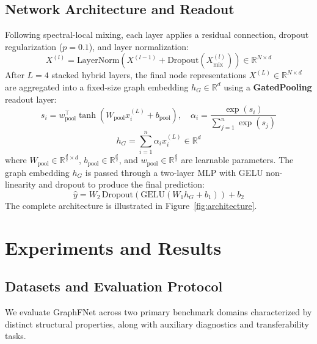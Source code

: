 \documentclass[10pt]{article}
\begin{document}
\subsection{Network Architecture and Readout}
Following spectral-local mixing, each layer applies a residual connection, dropout regularization ($p=0.1$), and layer normalization:
\begin{equation}
X^{(l)} = \text{LayerNorm}\left( X^{(l-1)} + \text{Dropout}\left( X^{(l)}_{\text{mix}} \right) \right) \in \mathbb{R}^{N \times d}
\end{equation}
After $L=4$ stacked hybrid layers, the final node representations $X^{(L)} \in \mathbb{R}^{N \times d}$ are aggregated into a fixed-size graph embedding $h_G \in \mathbb{R}^d$ using a \textbf{GatedPooling} readout layer:
\begin{equation}
\label{eq:gated_pool}
s_i = w_{\text{pool}}^\top \tanh\left( W_{\text{pool}} x_i^{(L)} + b_{\text{pool}} \right), \quad \alpha_i = \frac{\exp(s_i)}{\sum_{j=1}^n \exp(s_j)}
\end{equation}
\begin{equation}
h_G = \sum_{i=1}^n \alpha_i x_i^{(L)} \in \mathbb{R}^d
\end{equation}
where $W_{\text{pool}} \in \mathbb{R}^{\frac{d}{2} \times d}$, $b_{\text{pool}} \in \mathbb{R}^{\frac{d}{2}}$, and $w_{\text{pool}} \in \mathbb{R}^{\frac{d}{2}}$ are learnable parameters. The graph embedding $h_G$ is passed through a two-layer MLP with GELU non-linearity and dropout to produce the final prediction:
\begin{equation}
\hat{y} = W_2 \, \text{Dropout}\left( \text{GELU}\left( W_1 h_G + b_1 \right) \right) + b_2
\end{equation}
The complete architecture is illustrated in Figure~\ref{fig:architecture}.

\section{Experiments and Results}
\label{sec:results}

\subsection{Datasets and Evaluation Protocol}
\label{sec:protocol}

We evaluate GraphFNet across two primary benchmark domains characterized by distinct structural properties, along with auxiliary diagnostics and transferability tasks.
\end{document}
